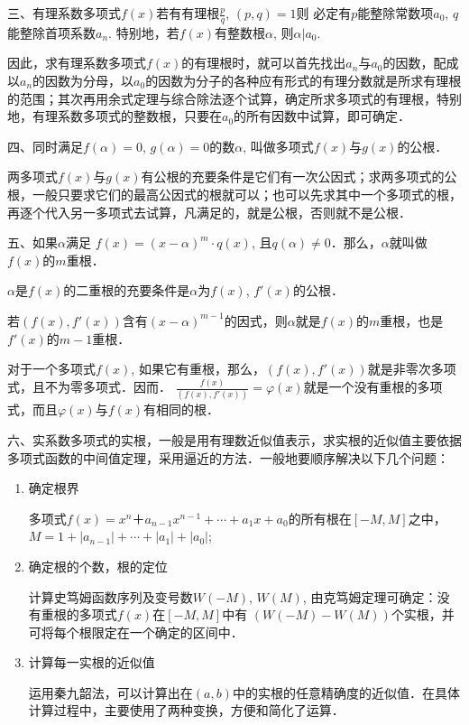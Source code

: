 三、有理系数多项式$f(x)$若有有理根$\frac{p}{q}$, $(p,q)=1$则
必定有$p$能整除常数项$a_0$, $q$能整除首项系数$a_n$. 特别地，若$f(x)$有整数根$\alpha$, 则$\alpha|a_0$. 

因此，求有理系数多项式$f(x)$的有理根时，就可以首先找出$a_n$与$a_0$的因数，配成以$a_n$的因数为分母，以$a_0$的因数为分子的各种应有形式的有理分数就是所求有理根的范围；其次再用余式定理与综合除法逐个试算，确定所求多项式的有理根，特别地，有理系数多项式的整数根，只要在$a_0$的所有因数中试算，即可确定．

四、同时满足$f(\alpha)=0$, $g(\alpha)=0$的数$\alpha$, 叫做多项式$f(x)$与$g(x)$的公根．

两多项式$f(x)$与$g(x)$有公根的充要条件是它们有一次公因式；求两多项式的公根，一般只要求它们的最高公因式的根就可以；也可以先求其中一个多项式的根，再逐个代入另一多项式去试算，凡满足的，就是公根，否则就不是公根．

五、如果$\alpha$满足
$f(x)=(x-\alpha)^m\cdot q(x)$, 且$q(\alpha)\ne 0$．那么，$\alpha$就叫做$f(x)$的$m$重根．

$\alpha$是$f(x)$的二重根的充要条件是$\alpha$为$f(x)$, $f'(x)$的公根．

若$(f(x),f'(x))$含有$(x-\alpha)^{m-1}$的因式，则$\alpha$就是$f(x)$的$m$重根，也是$f'(x)$的$m-1$重根．

对于一个多项式$f(x)$, 如果它有重根，那么，$(f(x),f'(x))$就是非零次多项式，且不为零多项式．因而．
$\frac{f (x)}{(f (x) ,f' (x) )}=\varphi(x)$就是一个没有重根的多项式，而且$\varphi(x)$与$f(x)$有相同的根．

六、实系数多项式的实根，一般是用有理数近似值表示，求实根的近似值主要依据多项式函数的中间值定理，采用逼近的方法．一般地要顺序解决以下几个问题：
\begin{enumerate}
    \item 确定根界
    
    多项式$f(x)=x^n＋a_{n-1}x^{n-1}+\cdots+a_1x+a_0$的所有根在$[-M,M]$之中，$M=1+|a_{n-1}|+\cdots+|a_1|+|a_0|$;
    
    \item 确定根的个数，根的定位
    
    计算史笃姆函数序列及变号数$W(-M)$, $W(M)$, 由克笃姆定理可确定：没有重根的多项式$f(x)$在$[-M,M]$中有
    $(W(-M)-W(M))$个实根，并可将每个根限定在一个确定的区间中．
    \item 计算每一实根的近似值
    
    运用秦九韶法，可以计算出在$(a,b)$中的实根的任意精确度的近似值．在具体计算过程中，主要使用了两种变换，方便和简化了运算．
 \end{enumerate}

